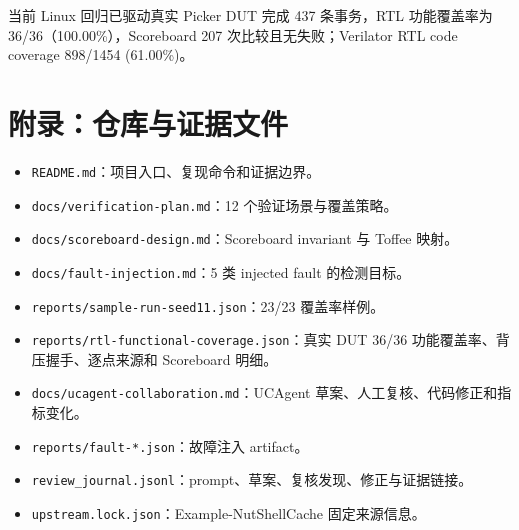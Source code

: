\documentclass[UTF8,fontset=windows,zihao=-4]{ctexart}
\newcommand{\tightsection}[1]{\section{#1}\vspace{-0.2em}}
\begin{document}
当前 Linux 回归已驱动真实 Picker DUT 完成 437 条事务，RTL 功能覆盖率为 36/36（100.00\%），Scoreboard 207 次比较且无失败；Verilator RTL code coverage 898/1454 (61.00\%)。

\tightsection{附录：仓库与证据文件}
\begin{itemize}
\item \texttt{README.md}：项目入口、复现命令和证据边界。
\item \texttt{docs/verification-plan.md}：12 个验证场景与覆盖策略。
\item \texttt{docs/scoreboard-design.md}：Scoreboard invariant 与 Toffee 映射。
\item \texttt{docs/fault-injection.md}：5 类 injected fault 的检测目标。
\item \texttt{reports/sample-run-seed11.json}：23/23 覆盖率样例。
\item \texttt{reports/rtl-functional-coverage.json}：真实 DUT 36/36 功能覆盖率、背压握手、逐点来源和 Scoreboard 明细。
\item \texttt{docs/ucagent-collaboration.md}：UCAgent 草案、人工复核、代码修正和指标变化。
\item \texttt{reports/fault-*.json}：故障注入 artifact。
\item \texttt{review\_journal.jsonl}：prompt、草案、复核发现、修正与证据链接。
\item \texttt{upstream.lock.json}：Example-NutShellCache 固定来源信息。
\end{itemize}
\end{document}
